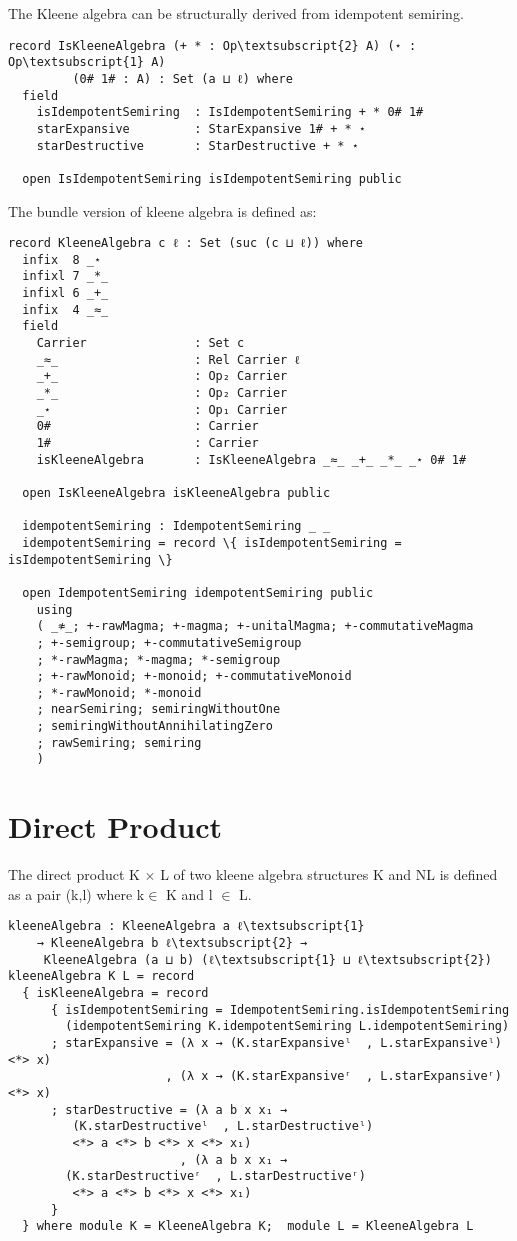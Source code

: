 The Kleene algebra can be structurally derived from idempotent semiring. 
\begin{Verbatim}
record IsKleeneAlgebra (+ * : Op\textsubscript{2} A) (⋆ : Op\textsubscript{1} A)
		 (0# 1# : A) : Set (a ⊔ ℓ) where
  field
    isIdempotentSemiring  : IsIdempotentSemiring + * 0# 1#
    starExpansive         : StarExpansive 1# + * ⋆
    starDestructive       : StarDestructive + * ⋆

  open IsIdempotentSemiring isIdempotentSemiring public
\end{Verbatim}
The bundle version of kleene algebra is defined as: 
\begin{Verbatim}
record KleeneAlgebra c ℓ : Set (suc (c ⊔ ℓ)) where
  infix  8 _⋆
  infixl 7 _*_
  infixl 6 _+_
  infix  4 _≈_
  field
    Carrier               : Set c
    _≈_                   : Rel Carrier ℓ
    _+_                   : Op₂ Carrier
    _*_                   : Op₂ Carrier
    _⋆                    : Op₁ Carrier
    0#                    : Carrier
    1#                    : Carrier
    isKleeneAlgebra       : IsKleeneAlgebra _≈_ _+_ _*_ _⋆ 0# 1#

  open IsKleeneAlgebra isKleeneAlgebra public

  idempotentSemiring : IdempotentSemiring _ _
  idempotentSemiring = record \{ isIdempotentSemiring = isIdempotentSemiring \}

  open IdempotentSemiring idempotentSemiring public
    using
    ( _≉_; +-rawMagma; +-magma; +-unitalMagma; +-commutativeMagma
    ; +-semigroup; +-commutativeSemigroup
    ; *-rawMagma; *-magma; *-semigroup
    ; +-rawMonoid; +-monoid; +-commutativeMonoid
    ; *-rawMonoid; *-monoid
    ; nearSemiring; semiringWithoutOne
    ; semiringWithoutAnnihilatingZero
    ; rawSemiring; semiring
    )
\end{Verbatim}
\section{Direct Product}
The direct product K \(\times\) L of two kleene algebra structures K and NL is defined as a pair (k,l) where k\(\in\) K and l \(\in\) L.
\begin{Verbatim}
kleeneAlgebra : KleeneAlgebra a ℓ\textsubscript{1} 
	→ KleeneAlgebra b ℓ\textsubscript{2} →
	 KleeneAlgebra (a ⊔ b) (ℓ\textsubscript{1} ⊔ ℓ\textsubscript{2})
kleeneAlgebra K L = record
  { isKleeneAlgebra = record
      { isIdempotentSemiring = IdempotentSemiring.isIdempotentSemiring 
		(idempotentSemiring K.idempotentSemiring L.idempotentSemiring)
      ; starExpansive = (λ x → (K.starExpansiveˡ  , L.starExpansiveˡ) <*> x)
                      , (λ x → (K.starExpansiveʳ  , L.starExpansiveʳ) <*> x)
      ; starDestructive = (λ a b x x₁ →
		 (K.starDestructiveˡ  , L.starDestructiveˡ)
		 <*> a <*> b <*> x <*> x₁)
                        , (λ a b x x₁ → 
		(K.starDestructiveʳ  , L.starDestructiveʳ)
		 <*> a <*> b <*> x <*> x₁)
      }
  } where module K = KleeneAlgebra K;  module L = KleeneAlgebra L
\end{Verbatim}

